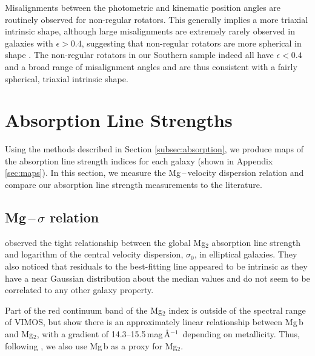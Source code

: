 \documentclass[a4paper,fleqn,usenatbib]{mnras}
\begin{document}
		Misalignments between the photometric and kinematic position angles are routinely observed for non-regular rotators. This generally implies a more triaxial intrinsic shape, although large misalignments are extremely rarely observed in galaxies with $\epsilon > 0.4$, suggesting that non-regular rotators are more spherical in shape \citep{Cappellari2016}. The non-regular rotators in our Southern sample indeed all have $\epsilon < 0.4$ and a broad range of misalignment angles and are thus consistent with a fairly spherical, triaxial intrinsic shape.

\section{Absorption Line Strengths}
	\label{sec:absorption}
	Using the methods described in Section \ref{subsec:absorption}, we produce maps of the absorption line strength indices for each galaxy (shown in Appendix \ref{sec:maps}). In this section, we measure the Mg\,--\,velocity dispersion relation and compare our absorption line strength measurements to the literature. 

	\subsection{Mg\,--\,$\sigma$ relation}
		\label{subsec:Mgsigma}
		\citet{Bender1993} observed the tight relationship between the global Mg$_2$ absorption line strength and logarithm of the central velocity dispersion, $\sigma_0$, in elliptical galaxies. They also noticed that residuals to the best-fitting line appeared to be intrinsic as they have a near Gaussian distribution about the median values and do not seem to be correlated to any other galaxy property. 

		Part of the red continuum band of the Mg$_2$ index is outside of the spectral range of VIMOS, but \citet{Ziegler1997} show there is an approximately linear relationship between Mg\,b and Mg$_2$, with a gradient of 14.3--15.5\,mag\,\AA$^{-1}$\ depending on metallicity. Thus, following \citet{Ziegler1997}, we also use Mg\,b as a proxy for Mg$_2$. 
\end{document}
